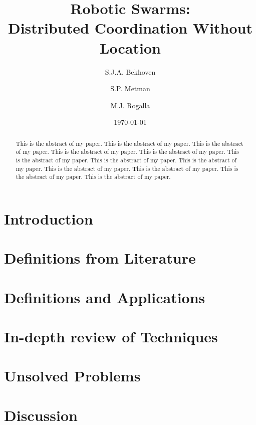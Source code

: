 \documentclass[a4paper]{article}
\title{Robotic Swarms: \\Distributed Coordination Without Location}
\author{S.J.A. Bekhoven  \and
    S.P. Metman \and
    M.J. Rogalla}
\date{\today}
\begin{document}
\maketitle
\thispagestyle{empty}

\begin{abstract}
This is the abstract of my paper.
This is the abstract of my paper.
This is the abstract of my paper.
This is the abstract of my paper.
This is the abstract of my paper.
This is the abstract of my paper.
This is the abstract of my paper.
This is the abstract of my paper.
This is the abstract of my paper.
This is the abstract of my paper.
This is the abstract of my paper.
This is the abstract of my paper.
\end{abstract}


\section{Introduction}
  

\section{Definitions from Literature}
  
  
\section{Definitions and Applications}
  
 
 \section{In-depth review of Techniques}
  

\section{Unsolved Problems}
  

\section{Discussion}
  




\end{document}
